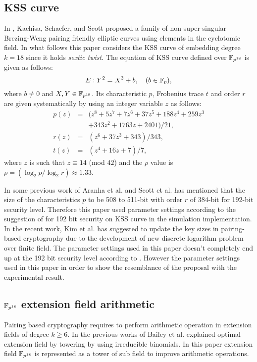 \subsection{KSS curve}
In  \cite{kss}, Kachisa, Schaefer, and Scott proposed a family of non super-singular Brezing-Weng pairing friendly elliptic curves using elements in the cyclotomic field. In what follows this paper considers the KSS curve of  embedding degree $k=18$ since it holds \textit{sextic twist}. 
The equation of KSS curve defined over $\mathbb{F}_{p^{18}}$ is given as follows:
\begin{equation}\label{eq:KSS_curve}
E:Y^2=X^3+b, \quad \mbox{($b \in {\mathbb{F}}_{p}$)},
\end{equation}
where $b \neq 0$ and $X,Y \in \mathbb{F}_{p^{18}}$. Its characteristic $p$, Frobenius trace $t$ and order $r$ are given systematically by using an integer variable $z$ as follows:
\begin{subequations}
\begin{eqnarray}
p(z) &= & (z^8 +5z^7 +7z^6 +37z^5 +188z^4 +259z^3  \nonumber \\ 								
& & + 343z^2 +1763z+2401)/21,\\\label{eq:kss_char}
r(z) &= &(z^6 + 37z^3 + 343)/343,\label{eq:kss_degree}  \\
t(z) &=& (z^4 + 16z + 7)/7, \label{eq:kss_trace} 
\end{eqnarray}
\end{subequations} 
where $z$ is such that $z \equiv 14$ (mod $42$) and the $\rho$ value is $\rho = (\log_2 p/\log_2 r) \approx 1.33$.

In some previous work of  Aranha et al. \cite{PAIRING:AFKMR12} and Scott et al. \cite{kss_param} has mentioned that the size of the characteristics $p$ to be 508 to 511-bit with order $r$ of 384-bit  for 192-bit security level.  
Therefore this paper used parameter settings according to the suggestion of \cite{PAIRING:AFKMR12} for 192 bit security on KSS curve in the simulation implementation. In the recent work, Kim et al. \cite{kim_ecdlp} has suggested to update the key sizes in pairing-based cryptography due to the  development of new discrete logarithm problem over finite field. The parameter settings used in this paper doesn't completely end up at the 192 bit security level according to \cite{kim_ecdlp}. However the parameter settings used in this paper in order to show the resemblance of the proposal with the experimental result.

\subsection{$\mathbb{F}_{p^{18}}$ extension field arithmetic}
Pairing based cryptography requires to perform arithmetic operation in extension fields of degree $k \geq 6$\cite{Silverman}. In the previous works of Bailey et al. \cite{JC:BaiPaa01}  explained optimal extension field by towering by using irreducible binomials.  In this paper extension field  $\mathbb{F}_{p^{18}}$ is represented as a tower of sub field to improve arithmetic operations. 


